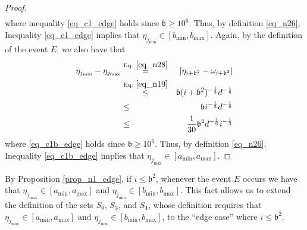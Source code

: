 \documentclass[11pt,letterpaper]{article}
\begin{document}
\begin{proof}
\begin{eqnarray}
\end{eqnarray}
%
where inequality \eqref{eq_c1_edge} holds since $\mathfrak{b} \geq 10^6$.
%
Thus, by definition \eqref{eq_n26}, Inequality \eqref{eq_c1_edge} implies that $\eta_{j_{\mathrm{min}}}  \in[b_{\mathrm{min}}, b_{\mathrm{max}}]$. 
%
Again, by the definition of the event $E$, we also have that 
%
\begin{eqnarray}
      \eta_{j_{\mathrm{min}}} - \eta_{j_{\mathrm{max}}} 
  & \stackrel{\textrm{Eq. } \eqref{eq_n28}}{=} & |\eta_{i+ \mathfrak{b}^2} -  \omega_{i+ \mathfrak{b}^2}| \nonumber\\ &\stackrel{\textrm{Eq. } \eqref{eq_n19}}{\leq}&   \mathfrak{b} (i+\mathfrak{b}^2)^{-\frac{1}{3}} d^{-\frac{1}{6}}\nonumber\\
    &\leq  &\mathfrak{b} i^{-\frac{1}{3}} d^{-\frac{1}{6}}\nonumber\\
    &\leq &\frac{1}{30} \mathfrak{b}^2 d^{-\frac{1}{6}} i^{-\frac{1}{3}} \label{eq_c1b_edge}
\end{eqnarray}
%
where \eqref{eq_c1b_edge} holds since $\mathfrak{b} \geq 10^6$.
%
Thus, by definition \eqref{eq_n26}, Inequality \eqref{eq_c1b_edge} implies that $\eta_{j_{\mathrm{max}}}  \in[a_{\mathrm{min}}, a_{\mathrm{max}}]$.
%
\end{proof}
%
%
\noindent
By Proposition \ref{prop_n1_edge}, if $i \leq \mathfrak{b}^2$,  whenever the event $E$ occurs we have that $ \eta_{j_{\mathrm{max}}}  \in[a_{\mathrm{min}}, a_{\mathrm{max}}]$ and  $ \eta_{j_{\mathrm{min}}}  \in[b_{\mathrm{min}}, b_{\mathrm{max}}]$.
%
 This fact allows us to extend the definition of the sets $S_0$, $S_3$, and $S_4$, whose definition requires that $ \eta_{j_{\mathrm{max}}}  \in[a_{\mathrm{min}}, a_{\mathrm{max}}]$ and  $ \eta_{j_{\mathrm{min}}}  \in[b_{\mathrm{min}}, b_{\mathrm{max}}]$, to the ``edge case'' where $i \leq \mathfrak{b}^2$.
 
\end{document}
